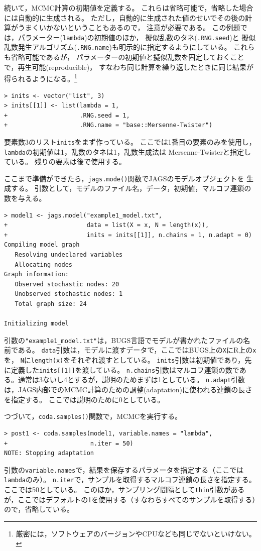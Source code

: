 \documentclass[11pt,uplatex]{jsarticle}
\begin{document}
続いて，MCMC計算の初期値を定義する。
これらは省略可能で，省略した場合には自動的に生成される。
ただし，自動的に生成された値のせいでその後の計算がうまくいかないということもあるので，
注意が必要である。
この例題では，パラメーター(\texttt{lambda})の初期値のほか，
擬似乱数のタネ(\texttt{.RNG.seed})と
擬似乱数発生アルゴリズム(\texttt{.RNG.name})も明示的に指定するようにしている。
これらも省略可能であるが，
パラメーターの初期値と擬似乱数を固定しておくことで，再生可能(reproducible)，
すなわち同じ計算を繰り返したときに同じ結果が得られるようになる。\footnote{厳密には，ソフトウェアのバージョンやCPUなども同じでないといけない。}
%
\begin{lstlisting}
> inits <- vector("list", 3)
> inits[[1]] <- list(lambda = 1,
+                    .RNG.seed = 1,
+                    .RNG.name = "base::Mersenne-Twister")
\end{lstlisting}
%
要素数3のリスト\texttt{inits}をまず作っている。
ここでは1番目の要素のみを使用し，
\texttt{lambda}の初期値は1，乱数のタネは1，乱数生成法は Mersenne-Twisterと指定している。
残りの要素は後で使用する。

ここまで準備ができたら，\texttt{jags.mode()}関数でJAGSのモデルオブジェクトを
生成する。
引数として，モデルのファイル名，データ，初期値，マルコフ連鎖の数を与える。
\begin{lstlisting}
> model1 <- jags.model("example1_model.txt",
+                      data = list(X = x, N = length(x)),
+                      inits = inits[[1]], n.chains = 1, n.adapt = 0)
Compiling model graph
   Resolving undeclared variables
   Allocating nodes
Graph information:
   Observed stochastic nodes: 20
   Unobserved stochastic nodes: 1
   Total graph size: 24

Initializing model

\end{lstlisting}
%
引数の\texttt{"example1\_model.txt"}は，BUGS言語でモデルが書かれたファイルの名前である。
\texttt{data}引数は，モデルに渡すデータで，ここではBUGS上の\texttt{X}に\textsf{R}上の\texttt{x}を，
\texttt{N}に\texttt{length(x)}をそれぞれ渡すとしている。
\texttt{inits}引数は初期値であり，先に定義した\texttt{inits[[1]]}を渡している。
\texttt{n.chains}引数はマルコフ連鎖の数である。通常は3ないし4とするが，説明のためまずは1としている。
\texttt{n.adapt}引数は，\textsf{JAGS}内部でのMCMC計算のための調整(adaptation)に使われる連鎖の長さを指定する。
ここでは説明のために0としている。

つづいて，\texttt{coda.samples()}関数で，MCMCを実行する。
\begin{lstlisting}
> post1 <- coda.samples(model1, variable.names = "lambda",
+                       n.iter = 50)
NOTE: Stopping adaptation

\end{lstlisting}
%
引数の\texttt{variable.names}で，結果を保存するパラメータを指定する（ここでは\texttt{lambda}のみ）。
\texttt{n.iter}で，サンプルを取得するマルコフ連鎖の長さを指定する。ここでは50としている。
このほか，サンプリング間隔として\texttt{thin}引数があるが，ここではデフォルトの1を使用する（すなわちすべてのサンプルを取得する）ので，省略している。
\end{document}
